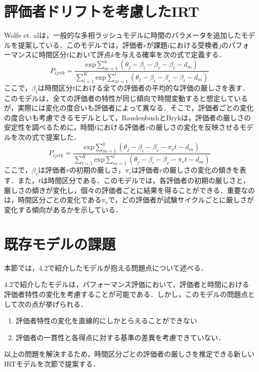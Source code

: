 \documentclass[a4paper,11pt,oneside,openany]{jsbook}
\begin{document}
\section{評価者ドリフトを考慮したIRT}

Wolfe et. al\cite{Wolfe}は，一般的な多相ラッシュモデルに時間のパラメータを追加したモデルを提案している．このモデルでは，評価者$r$が課題$i$における受検者$j$のパフォーマンスに時間区分$t$において評点$k$を与える確率を次の式で定義する．
\begin{equation}
P_{ijrtk}=\frac{\mathrm{exp}\sum_{m=1}^{k}(\theta_{j}-\beta_{i}-\beta_{r}-\beta_{t}-d_{m})}{\sum_{l=1}^{K}\mathrm{exp}\sum_{m=1}^{l}(\theta_{j}-\beta_{i}-\beta_{r}-\beta_{t}-d_{m})}
\end{equation}
ここで，$\beta_t$は時間区分$t$における全ての評価者の平均的な評価の厳しさを表す．
このモデルは，全ての評価者の特性が同じ傾向で時間変動すると想定しているが，実際には変化の度合いも評価者によって異なる．そこで，評価者ごとの変化の度合いも考慮できるモデルとして，RaudenbushとBryk\cite{Raudenbush}は，評価者の厳しさの安定性を調べるために，時間$t$における評価者$r$の厳しさの変化を反映させるモデルを次の式で提案した．
\begin{equation}
P_{ijrtk}=\frac{\mathrm{exp}\sum_{m=1}^{k}(\theta_{j}-\beta_{i}-\beta_{r} - \pi_{r}t-d_{m})}{\sum_{l=1}^{K}\mathrm{exp}\sum_{m=1}^{l}(\theta_{j}-\beta_{i}-\beta_{r} - \pi_{r}t-d_{m})}
\end{equation}
ここで，$\beta_{r}$は評価者$r$の初期の厳しさ，$\pi_{r}$は評価者$r$の厳しさの変化の傾きを表す．また，$t$は時間区分である．このモデルでは，各評価者の初期の厳しさと，厳しさの傾きが変化し，個々の評価者ごとに結果を得ることができる．重要なのは，時間区分ごとの変化である$\pi_{r}$で，どの評価者が試験サイクルごとに厳しさが変化する傾向があるかを示している．

\section{既存モデルの課題}
本節では，4.2で紹介したモデルが抱える問題点について述べる．

4.2で紹介したモデルは，パフォーマンス評価において，評価者と時間における評価者特性の変化を考慮することが可能である．しかし，このモデルの問題点として次の点が挙げられる．
\begin{enumerate}
  \item 評価者特性の変化を直線的にしかとらえることができない
  \item 評価者の一貫性と各得点に対する基準の差異を考慮できていない．
\end{enumerate}  
以上の問題を解決するため，時間区分ごとの評価者の厳しさを推定できる新しいIRTモデルを次節で提案する．
\newpage
\end{document}
